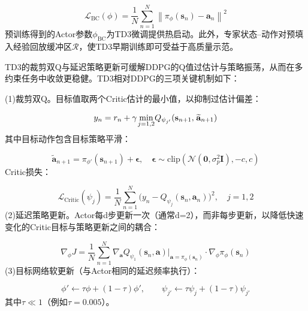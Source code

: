 \begin{equation}
\label{eq:78}
{\mathcal{L}_{{\text{BC}}}}(\phi ) = \frac{1}{N}\sum\limits_{n = 1}^N {{{\left\| {{\pi _\phi }({{\mathbf{s}}_n}) - {{\mathbf{a}}_n}} \right\|}^2}} 
\end{equation}
预训练得到的Actor参数${\phi _{{\text{BC}}}}$为TD3微调提供热启动。此外，专家状态–动作对预填入经验回放缓冲区$\mathcal{R}$，使TD3早期训练即可受益于高质量示范。

TD3的裁剪双Q与延迟策略更新可缓解DDPG的Q值过估计与策略振荡，从而在多约束任务中收敛更稳健。TD3相对DDPG的三项关键机制如下：

(1)裁剪双Q。目标值取两个Critic估计的最小值，以抑制过估计偏差：

\begin{equation}
\label{eq:79}
{y_n} = {r_n} + \gamma {\kern 1pt} {\min _{j = 1,2}}{Q_{{\psi _{j'}}}}({{\mathbf{s}}_{n + 1}},{\kern 1pt} {\widetilde {\mathbf{a}}_{n + 1}})
\end{equation}
其中目标动作包含目标策略平滑：

\begin{equation}
\label{eq:80}
{\widetilde {\mathbf{a}}_{n + 1}} = {\pi _{\phi '}}({{\mathbf{s}}_{n + 1}}) + {\boldsymbol{\epsilon }},\quad {\boldsymbol{\epsilon }} \sim {\text{clip}}\left( {\mathcal{N}({\mathbf{0}},\sigma _p^2{\mathbf{I}}), - c,c} \right)
\end{equation}
Critic损失：

\begin{equation}
\label{eq:81}
{\mathcal{L}_{{\text{Critic}}}}({\psi _j}) = \frac{1}{N}\sum\limits_{n = 1}^N ( {y_n} - {Q_{{\psi _j}}}({{\mathbf{s}}_n},{{\mathbf{a}}_n}){)^2},\quad j = 1,2
\end{equation}
(2)延迟策略更新。Actor每d步更新一次（通常d=2），而非每步更新，以降低快速变化的Critic目标与策略更新之间的耦合：

\begin{equation}
\label{eq:82}
{\nabla _\phi }J = \frac{1}{N}\sum\limits_{n = 1}^N {{\nabla _{\mathbf{a}}}} {Q_{{\psi _1}}}({{\mathbf{s}}_n},{\mathbf{a}}){|_{{\mathbf{a}} = {\pi _\phi }({{\mathbf{s}}_n})}} \cdot {\nabla _\phi }{\pi _\phi }({{\mathbf{s}}_n})
\end{equation}
(3)目标网络软更新（与Actor相同的延迟频率执行）：

\begin{equation}
\label{eq:83}
\phi ' \leftarrow \tau \phi  + (1 - \tau )\phi ',\qquad {\psi _{j'}} \leftarrow \tau {\psi _j} + (1 - \tau ){\psi _{j'}}
\end{equation}
其中$\tau  \ll 1$（例如$\tau  = 0.005$）。

